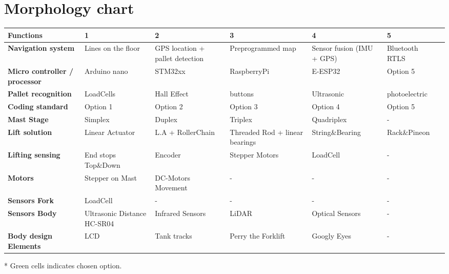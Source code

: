 \documentclass[landscape]{article}
\begin{document}
\section{Morphology chart}
\begin{table}[H]
    \begin{center}
        \begin{tabularx}{\linewidth}{L|L|L|L|L|L|L}
            \textbf{Functions} & \textbf{1} & \textbf{2}& \textbf{3} & 
            \textbf{4} & \textbf{5} \\
            \hline
            \textbf{Navigation system} & Lines on the floor & GPS location + pallet detection & Preprogrammed map  & Sensor fusion (IMU + GPS) & 
            Bluetooth RTLS \\
            \hline
            \textbf{Micro controller / processor} & Arduino nano & STM32xx & RaspberryPi& E-ESP32 & 
            Option 5 \\
            \hline
            \textbf{Pallet recognition} & LoadCells & Hall Effect & buttons & Ultrasonic & 
            photoelectric \\
            \hline
            \textbf{Coding standard} & Option 1 & Option 2 & Option 3 & Option 4 & 
            Option 5 \\
            \hline
            \textbf{Mast Stage} & Simplex & Duplex & Triplex & Quadriplex & 
            -\\
            \hline
            \textbf{Lift solution} & Linear Actuator & L.A + RollerChain & Threaded Rod + linear bearings& String\&Bearing & Rack\&Pineon \\
            \hline
            \textbf{Lifting sensing} & End stops Top\&Down & Encoder & Stepper Motors & LoadCell & 
            -\\
            \hline
            \textbf{Motors} & Stepper on Mast & DC-Motors Movement & - & - & 
            -\\
            \hline
            \textbf{Sensors Fork} & LoadCell & - & - & - & 
            -\\
            \hline
            \textbf{Sensors Body} & Ultrasonic Distance HC-SR04 & Infrared Sensors & LiDAR & Optical Sensors & 
            -\\
            \hline
            \textbf{Body design Elements} & LCD & Tank tracks &Perry the Forklift & Googly Eyes & 
            - \\
            \hline
        \end{tabularx}
    \end{center}
\end{table}
* Green cells indicates chosen option.
\end{document}
